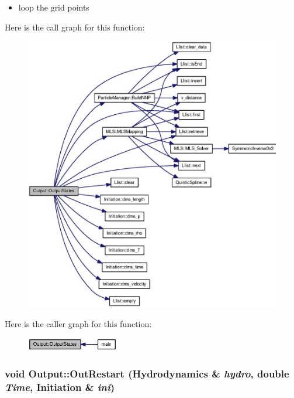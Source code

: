 \begin{itemize}
\item loop the grid points \end{itemize}


Here is the call graph for this function:\nopagebreak
\begin{figure}[H]
\begin{center}
\leavevmode
\includegraphics[width=337pt]{classOutput_2b41cacb61eecf10cbaca6bebb3e6316_cgraph}
\end{center}
\end{figure}


Here is the caller graph for this function:\nopagebreak
\begin{figure}[H]
\begin{center}
\leavevmode
\includegraphics[width=114pt]{classOutput_2b41cacb61eecf10cbaca6bebb3e6316_icgraph}
\end{center}
\end{figure}
\hypertarget{classOutput_a96aad43762590fc7779d24050c0a151}{
\subsubsection[{OutRestart}]{\setlength{\rightskip}{0pt plus 5cm}void Output::OutRestart ({\bf Hydrodynamics} \& {\em hydro}, \/  double {\em Time}, \/  {\bf Initiation} \& {\em ini})}}
\label{classOutput_a96aad43762590fc7779d24050c0a151}


